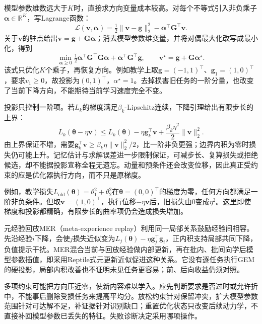 模型参数维数远大于$K$时，直接求方向变量成本较高。对每个不等式引入非负乘子$\bm\alpha\in\mathbb R^K$，写Lagrange函数：
\[
\mathcal L(\bm v,\bm\alpha)
=\tfrac12\lVert\bm v-\bm g\rVert_2^2
-\bm\alpha^\top\bm G^\top\bm v.
\]
关于$\bm v$的驻点给出$\bm v=\bm g+\bm G\bm\alpha$；消去模型参数维变量，并将对偶最大化改写成最小化，得到
\begin{equation}
\min_{\bm\alpha\ge0}
\tfrac12\bm\alpha^\top\bm G^\top\bm G\bm\alpha
+\bm\alpha^\top\bm G^\top\bm g,
\qquad
\bm v^\star=\bm g+\bm G\bm\alpha^\star.
\label{eq:ket-update-gem-dual}
\end{equation}
该式只优化$K$个乘子，再恢复方向。例如教学上取$\bm g=(-1,1)^\top$、$\bm g_1=(1,0)^\top$，要求$v_1\geq0$，故投影为$(0,1)^\top$，$\alpha^\star=1$。去掉损害旧任务的一阶分量，也改变了当前下降方向，不能期待当前学习速度完全不变。

投影只控制一阶项。若$L_k$的梯度满足$\beta_k$-Lipschitz连续，下降引理给出有限步长的上界：
\[
L_k(\bm\theta-\eta\bm v)
\le L_k(\bm\theta)-\eta\bm g_k^\top\bm v
+\frac{\beta_k\eta^2}{2}\lVert\bm v\rVert_2^2.
\]
由上界保证不增，需要$\bm g_k^\top\bm v\geq\beta_k\eta\lVert\bm v\rVert_2^2/2$，比一阶非负更强；边界内积为零时损失仍可能上升。记忆估计与求解误差进一步限制保证，可减步长、复算损失或拒绝候选，却不能据投影宣称全程无遗忘。动量和预条件还会改变位移，因此真正受约束的应是优化器执行方向，而不只是原梯度。

例如，教学损失$L_{\mathrm{old}}(\bm\theta)=\theta_1^2+\theta_2^2$在$\bm\theta=(0,0)^\top$的梯度为零，任何方向都满足一阶非负条件。但取$\bm v=(1,0)^\top$，执行位移$-\eta\bm v$后，旧损失由0变成$\eta^2$。这里即使梯度和投影都精确，有限步长的曲率项仍会造成损失增加。

元经验回放MER（meta-experience replay）利用同一局部关系鼓励经验间相容。先沿经验$i$下降，会使$j$损失近似变为$L_j(\bm\theta)-\eta\bm g_j^\top\bm g_i$，正内积支持局部共同下降，负值提示干扰。MER混合当前与回放经验做内部更新，再在批内、批间向学后模型参数插值，即采用Reptile式元更新近似促进这种关系。它没有逐任务执行GEM的硬投影，局部内积改善也不证明未见任务更容易；前、后向收益仍须对照。

多项约束可能把方向压近零，使新内容难以学入。应先判断要求是否过时或允许折中，不能事后删除受损任务来提高平均分。放松约束针对保留冲突，扩大模型参数范围针对可达解不足，补证据针对识别缺口；重置优化状态只改变后续动力学，不直接补回模型参数已丢失的特征。失败诊断决定采用哪项操作。


